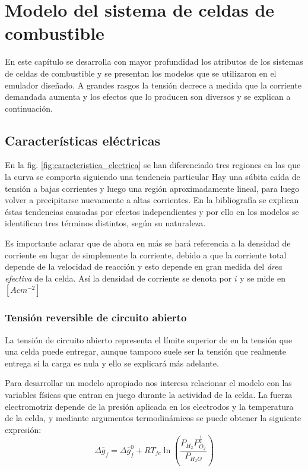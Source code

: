 
\chapter{Modelo del sistema de celdas de combustible}
\label{ch:modelo}
En este capítulo se desarrolla con mayor profundidad los atributos de los sistemas de celdas de combustible y se presentan los modelos que
se utilizaron en el emulador diseñado. A grandes rasgos la tensión decrece a medida que la corriente demandada aumenta y los efectos que
lo producen son diversos y se explican a continuación.

\section{Características eléctricas}
\label{sec:cacteristicas}
En la fig. \ref{fig:caracteristica_electrica} se han diferenciado tres regiones en las que la curva se comporta siguiendo una tendencia particular
Hay una súbita caída de tensión a bajas corrientes y luego una región aproximadamente lineal, para luego volver a precipitarse nuevamente a altas corrientes.
En la bibliografía se explican éstas tendencias causadas por efectos independientes y por ello en los modelos se identifican tres términos distintos,
según su naturaleza.

Es importante aclarar que de ahora en más se hará referencia a la densidad de corriente en lugar de simplemente la corriente,
debido a que la corriente total depende de la velocidad de reacción y esto depende en gran medida del \emph{área efectiva}
de la celda. Así la densidad de corriente se denota por $i$ y se mide en $[Acm^{-2}]$

\subsection{Tensión reversible de circuito abierto}
La tensión de circuito abierto representa el límite superior de en la tensión que una celda puede entregar, aunque tampoco suele ser la tensión que
realmente entrega si la carga es nula y ello se explicará más adelante.

Para desarrollar un modelo apropiado nos interesa relacionar el modelo con las variables físicas que entran en juego durante la actividad de la celda.
La fuerza electromotriz depende de la presión aplicada en los electrodos y  la temperatura de la celda, y mediante argumentos termodinámicos se
puede obtener la siguiente expresión:
$$ \Delta \overline{g}_f =  \Delta \overline{g}^{0}_{f} + RT_{fc}\ln(\frac{P_{H_2} P_{O_2}^\frac{1}{2}}{P_{H_2O}})$$

